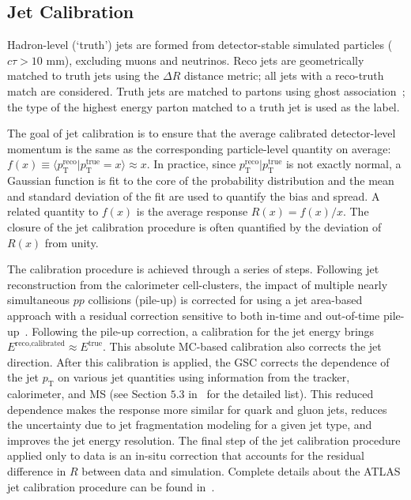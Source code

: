 \subsection{Jet Calibration}
\label{sec:ATLAS:jet_calibration}
Hadron-level (`truth') jets are formed from detector-stable simulated particles ($c\tau > 10$ mm), excluding muons and neutrinos.  Reco jets are geometrically matched to truth jets using the $\Delta R$ distance metric; all jets with a reco-truth match are considered.  Truth jets are matched to partons using ghost association~\cite{Cacciari:2008gn}; the type of the highest energy parton matched to a truth jet is used as the label. 

The goal of jet calibration is to ensure that the average calibrated detector-level momentum is the same as the corresponding particle-level quantity on average: $f(x)\equiv\langle p_\text{T}^\text{reco}|p_\text{T}^\text{true}=x\rangle\approx x$.  In practice, since $p_\text{T}^\text{reco}|p_\text{T}^\text{true}$ is not exactly normal, a Gaussian function is fit to the core of the probability distribution and the mean and standard deviation of the fit are used to quantify the bias and spread.  A related quantity to $f(x)$ is the average response $R(x)=f(x)/x$.  The closure of the jet calibration procedure is often quantified by the deviation of $R(x)$ from unity.

The calibration procedure is achieved through a series of steps.
Following jet reconstruction from the calorimeter cell-clusters, the impact of multiple nearly simultaneous $pp$ collisions (pile-up) is corrected for using a jet area-based~\cite{Cacciari:2007fd,Cacciari:2008gn} approach with a residual correction sensitive to both in-time and out-of-time pile-up~\cite{Aad:2015ina}.
Following the pile-up correction, a calibration for the jet energy brings $E^\text{reco,calibrated}\approx E^\text{true}$.
This absolute MC-based calibration also corrects the jet direction.
After this calibration is applied, the GSC corrects the dependence of the jet $p_\text{T}$ on various jet quantities using information from the tracker, calorimeter, and MS (see Section $5.3$ in~\cite{PERF-2016-04} for the detailed list).
This reduced dependence makes the response more similar for quark and gluon jets, reduces the uncertainty due to jet fragmentation modeling for a given jet type, and improves the jet energy resolution.
The final step of the jet calibration procedure applied only to data is an in-situ correction that accounts for the residual difference in $R$ between data and simulation.
Complete details about the ATLAS jet calibration procedure can be found in~\cite{PERF-2016-04,Aad:2011he}.  

